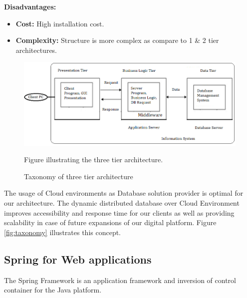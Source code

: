 \textbf{Disadvantages:}   
\begin{itemize}
    \item \textbf{Cost:} High installation cost.
    \item \textbf{Complexity:} Structure is more complex as compare to 1 \& 2 tier architectures.
\end{itemize}

\begin{figure} 
\centering
\includegraphics[width=14cm]{pictures/three-tier.png}
\caption{Taxonomy of three tier architecture}
Figure illustrating the three tier architecture. 
\label{fig:three_tier_pic}
\end{figure}


The usage of Cloud environments as Database solution provider is optimal for our architecture. The dynamic distributed database over Cloud Environment improves accessibility and response time for our clients as well as providing scalability in case of future expansions of our digital platform. Figure \ref{fig:taxonomy} illustrates this concept.







\subsection{Spring for Web applications}
\label{sec:spring_web}
The Spring Framework is an application framework and inversion of control container for the Java platform. 

